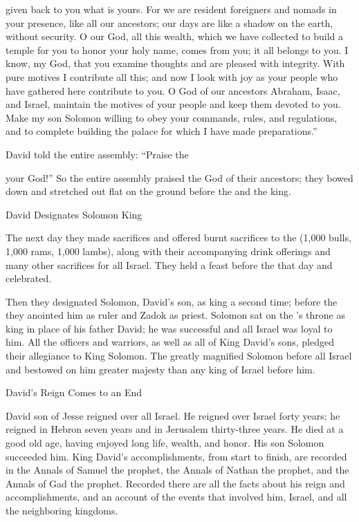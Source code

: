 {given
back to you what is yours.
For
we
are resident foreigners
and nomads
in your presence,
like all
our ancestors;
our days
are like a shadow
on
the earth,
without
security.
O
{}
our God,
all
this
wealth,
which
we have collected
to build
a temple
for you to honor
your holy
name, comes from you; it
all belongs to you.
I know,
my God,
that
you
examine
thoughts
and are pleased
with integrity.
With pure
motives
I
contribute
all
this;
and now
I look
with joy
as your people
who have gathered
here
contribute to you.
O
{}
God
of our ancestors
Abraham,
Isaac,
and Israel,
maintain
the motives
of your people
and keep
them devoted
to you.
Make
my son
Solomon
willing
to obey
your commands,
rules,
and regulations,
and to complete building
the palace
for which
I have made preparations.”
\par }{\PP {}David
told
the entire
assembly: “Praise
the

{}
your God!” So
the entire
assembly
praised
the {}
God
of their ancestors;
they bowed
down and stretched out flat on the ground before
the {}
and the king.
\par }{\SH David Designates Solomon King
\par }{\PP {}The next
day
they made sacrifices
and offered
burnt sacrifices
to the
{}
(1,000
bulls,
1,000
rams,
1,000
lambs), along with their accompanying drink offerings
and many
other sacrifices for all
Israel.
They held
a feast
before
the {}
that day
and celebrated.
\par }{\PP Then they designated Solomon,
David’s
son,
as king
a second
time; before the
{}
they anointed
him as ruler
and Zadok
as priest.
Solomon
sat
on
the
{}’s
throne
as king
in place
of his father
David;
he was successful
and all
Israel
was loyal to him.
All
the officers
and warriors,
as well
as all
of King
David’s
sons,
pledged
their allegiance
to King
Solomon.
The
{}
greatly magnified
Solomon
before
all
Israel
and bestowed
on
him greater
majesty
than any
king
of Israel
before him.
\par }{\SH David’s Reign Comes to an End
\par }{\PP {}David
son
of Jesse
reigned
over
all
Israel.
He reigned
over
Israel
forty
years;
he reigned
in Hebron
seven
years
and in Jerusalem
thirty-three
years.
He died
at a good
old age,
having enjoyed
long life,
wealth,
and honor.
His son
Solomon
succeeded him.
King
David’s
accomplishments, from start
to finish,
are recorded
in the Annals
of Samuel
the prophet,
the Annals
of Nathan
the prophet,
and the Annals
of Gad the prophet.
Recorded there are all
the facts about his reign
and accomplishments,
and an account of the events that
involved him,
Israel,
and all
the neighboring
kingdoms.
\par }